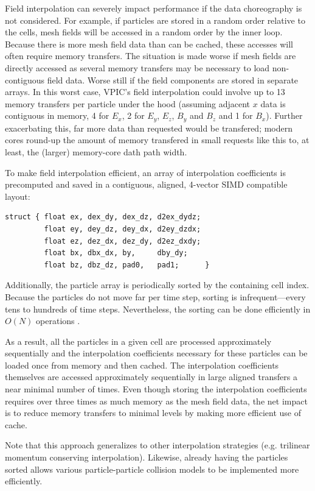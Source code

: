 \documentclass[aps,prl,preprint,preprintnumbers,groupedaddress]{revtex4}
\begin{document}
Field interpolation can severely impact performance if the data
choreography is not considered.  For example, if particles are stored
in a random order relative to the cells, mesh fields will be accessed
in a random order by the inner loop.  Because there is more mesh field
data than can be cached, these accesses will often require memory
transfers.  The situation is made worse if mesh fields are directly
accessed as several memory transfers may be necessary to load
non-contiguous field data.  Worse still if the field components are
stored in separate arrays.  In this worst case, VPIC's field
interpolation could involve up to 13 memory transfers per particle
under the hood (assuming adjacent $x$ data is contiguous in memory, 4
for $E_x$, 2 for $E_y$, $E_z$, $B_y$ and $B_z$ and 1 for $B_x$).
Further exacerbating this, far more data than requested would be
transfered; modern cores round-up the amount of memory transfered in
small requests like this to, at least, the (larger) memory-core dath
path width.

To make field interpolation efficient, an array of interpolation
coefficients is precomputed and saved in a contiguous, aligned,
4-vector SIMD compatible layout:
\begin{verbatim}
struct { float ex, dex_dy, dex_dz, d2ex_dydz;
         float ey, dey_dz, dey_dx, d2ey_dzdx;
         float ez, dez_dx, dez_dy, d2ez_dxdy;
         float bx, dbx_dx, by,     dby_dy;
         float bz, dbz_dz, pad0,   pad1;      }
\end{verbatim}
Additionally, the particle array is periodically sorted by the
containing cell index.  Because the particles do not move far per time
step, sorting is infrequent---every tens to hundreds of time steps.
Nevertheless, the sorting can be done efficiently in $O(N)$ operations
\cite{Bowers_2001}.

As a result, all the particles in a given cell are processed
approximately sequentially and the interpolation coefficients
necessary for these particles can be loaded once from memory and then
cached.  The interpolation coefficients themselves are accessed
approximately sequentially in large aligned transfers a near minimal
number of times.  Even though storing the interpolation coefficients
requires over three times as much memory as the mesh field data, the
net impact is to reduce memory transfers to minimal levels by making
more efficient use of cache.

Note that this approach generalizes to other interpolation strategies
(e.g. trilinear momentum conserving interpolation).  Likewise, already
having the particles sorted allows various particle-particle
collision models to be implemented more efficiently.  
\end{document}
